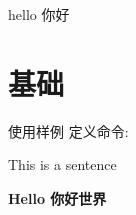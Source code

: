 \documentclass[fontset=windows, 12pt]{article}
\def\testsentence{This is a sentence}
\def\Emph#1{\textbf{#1}}
\begin{document}
	hello 你好

\section{基础}
\begin{tformal}{使用样例}
定义命令:

\testsentence

\Emph{Hello 你好世界}
\end{tformal}
\end{document}
